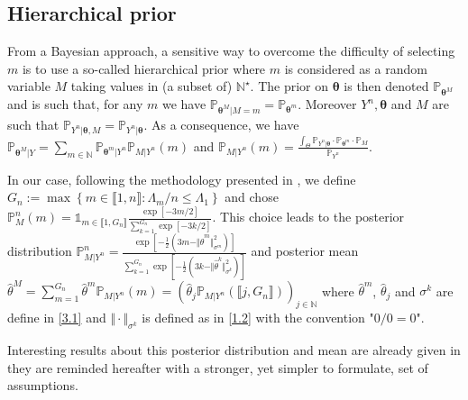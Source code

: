 \subsection{Hierarchical prior}\label{3.3}
From a Bayesian approach, a sensitive way to overcome the difficulty of selecting $m$ is to use a so-called hierarchical prior where $m$ is considered as a random variable $M$ taking values in (a subset of) $\mathds{N}^{\star}$.
The prior on $\boldsymbol{\theta}$ is then denoted $\mathds{P}_{\boldsymbol{\theta}^{M}}$ and is such that, for any $m$ we have $\mathds{P}_{\boldsymbol{\theta}^{M}\vert M=m} = \mathds{P}_{\boldsymbol{\theta}^{m}}$.
Moreover $Y^{n}, \boldsymbol{\theta}$ and $M$ are such that $\mathds{P}_{Y^{n} \vert \boldsymbol{\theta}, M} = \mathds{P}_{Y^{n} \vert \boldsymbol{\theta}}$.
As a consequence, we have $\mathds{P}_{\boldsymbol{\theta}^{M} \vert Y} = \sum\limits_{m \in \mathds{N}} \mathds{P}_{\boldsymbol{\theta}^{m}\vert Y^{n}} \mathds{P}_{M \vert Y^{n}}(m)$ and $\mathds{P}_{M \vert Y^{n}}(m) = \frac{\int_{\Theta}\mathds{P}_{Y^{n} \vert \boldsymbol{\theta}} \cdot \mathds{P}_{\boldsymbol{\theta}^{m}} \cdot \mathds{P}_{M}}{\mathds{P}_{Y^{n}}}$.

\medskip

In our case, following the methodology presented in \textsc{\citet{JJASRS}}, we define $G_{n} := \max\left\{m \in \llbracket 1, n \rrbracket : \Lambda_{m} / n \leq \Lambda_{1}\right\}$ and chose $\mathds{P}_{M}^{n}(m) = \mathds{1}_{m \in \llbracket 1, G_{n} \rrbracket}\frac{\exp\left[-3 m / 2\right]}{\sum\limits_{k = 1}^{G_{n}} \exp [-3 k / 2]}$.
This choice leads to the posterior distribution $\mathds{P}_{M \vert Y^{n}}^{n} = \frac{\exp\left[-\frac{1}{2}\left(3 m - \Vert \widehat{\theta}^{m} \Vert_{\sigma^{m}}^{2}\right)\right]}{\sum\limits_{k = 1}^{G_{n}} \exp\left[-\frac{1}{2}\left(3 k - \Vert \widehat{\theta}^{k} \Vert_{\sigma^{k}}^{2}\right)\right]}$ and posterior mean $\widehat{\theta}^{M} = \sum\limits_{m = 1}^{G_{n}} \widehat{\theta}^{m} \mathds{P}_{M \vert Y^{n}}(m) = \left(\widehat{\theta}_{j} \mathds{P}_{M \vert Y^{n}}(\llbracket j, G_{n} \rrbracket)\right)_{j \in \mathds{N}}$ where $\widehat{\theta}^{m}$, $\widehat{\theta}_{j}$ and $\sigma^{k}$ are define in \textsc{\cref{3.1}} and $\Vert \cdot \Vert_{\sigma^{k}}$ is defined as in \textsc{\cref{1.2}} with the convention "$0/0 = 0$".

\medskip

Interesting results about this posterior distribution and mean are already given in \textsc{\citet{JJASRS}} they are reminded hereafter with a stronger, yet simpler to formulate, set of assumptions.

